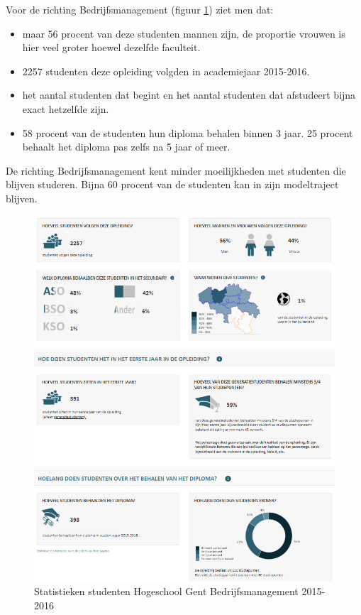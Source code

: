 Voor de richting Bedrijfsmanagement (figuur \ref{fig:vlaanderenbm}) ziet men dat:
\begin{itemize}
	\item maar 56 procent van deze studenten mannen zijn, de proportie vrouwen is hier veel groter hoewel dezelfde faculteit.
	\item 2257 studenten deze opleiding volgden in academiejaar 2015-2016.
	\item het aantal studenten dat begint en het aantal studenten dat afstudeert bijna exact hetzelfde zijn.
	\item 58 procent van de studenten hun diploma behalen binnen 3 jaar. 25 procent behaalt het diploma pas zelfs na 5 jaar of meer.
\end{itemize}

De richting Bedrijfsmanagement kent minder moeilijkheden met studenten die blijven studeren. Bijna 60 procent van de studenten kan in zijn modeltraject blijven.

\begin{figure}
	\includegraphics[width=\textwidth]
	{img/vlaanderen_bm.png}
	\caption{Statistieken studenten Hogeschool Gent Bedrijfsmanagement 2015-2016
		\autocite{Onderwijs.vlaanderen.be2017}}
	\label{fig:vlaanderenbm}
\end{figure}

